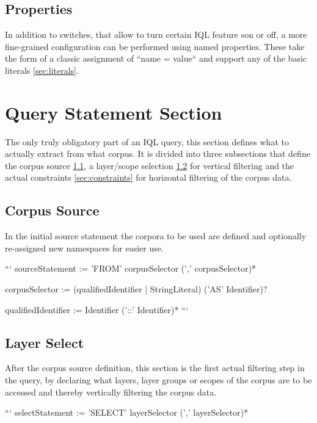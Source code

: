 \documentclass[11pt]{article}
\begin{document}
\subsection{Properties}
\label{sec:properties}

In addition to switches, that allow to turn certain IQL feature son or off, a more fine-grained configuration can be performed using named properties. These take the form of a classic assignment of ``name = value`` and support any of the basic literals \cref{sec:literals}.

\section{Query Statement Section}
\label{sec:query-statement}

The only truly obligatory part of an IQL query, this section defines what to actually extract from what corpus. It is divided into three subsections that define the corpus source \cref{sec:corpus-source}, a layer/scope selection \cref{sec:layer-select} for vertical filtering and the actual constraints \cref{sec:constraints} for horizontal filtering of the corpus data. 

\subsection{Corpus Source}
\label{sec:corpus-source}

In the initial source statement the corpora to be used are defined and optionally re-assigned new namespaces for easier use.

```
sourceStatement := 'FROM' corpusSelector (',' corpusSelector)*

corpusSelector := (qualifiedIdentifier | StringLiteral) ('AS' Identifier)?

qualifiedIdentifier := Identifier ('::' Identifier)*
```

\subsection{Layer Select}
\label{sec:layer-select}

After the corpus source definition, this section is the first actual filtering step in the query, by declaring what layers, layer groups or scopes of the corpus are to be accessed and thereby vertically filtering the corpus data.

```
selectStatement := 'SELECT' layerSelector (',' layerSelector)*
\end{document}
